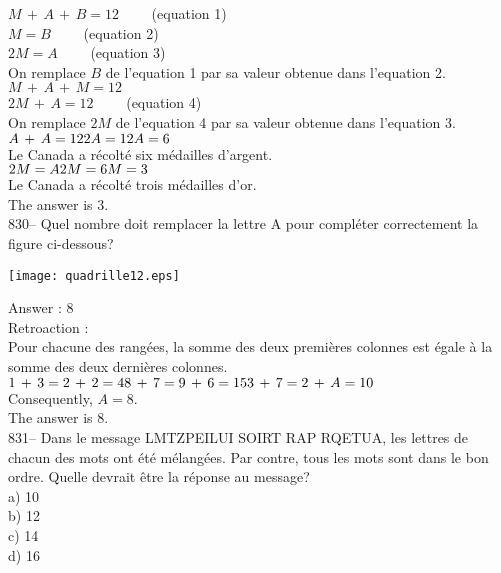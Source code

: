 ﻿\documentclass[letterpaper, 12pt]{article}
\begin{document}
$M\,+\,A\,+\,B=12 \qquad$ (equation 1)\\
$M=B \qquad$ (equation 2)\\
$2M=A \qquad$ (equation 3)\\

On remplace $B$ de l'equation 1 par sa valeur obtenue dans l'equation
2.\\
$M\,+\,A\,+\,M=12$\\
$2M\,+\,A=12 \qquad$ (equation 4)\\

On remplace $2M$ de l'equation 4 par sa valeur obtenue dans l'equation
3.\\
$A\,+\,A=12\\
2A = 12\\
A=6$\\
Le Canada a r\'ecolt\'e six m\'edailles d'argent.\\

$2M=A\\
2M=6\\
M=3$\\
Le Canada a r\'ecolt\'e trois m\'edailles d'or.\\


The answer is 3.\\

830-- Quel nombre doit remplacer la lettre A pour compl\'eter correctement
la figure ci-dessous?\\
    \begin{center}
    \texttt{[image: quadrille12.eps]}
    \end{center}


Answer : 8\\

Retroaction : \\
Pour chacune des rang\'ees, la somme des deux premi\`eres colonnes est
\'egale \`a la somme des deux derni\`eres colonnes.\\
$1\,+\,3=2\,+\,2=4\\
8\,+\,7=9\,+\,6=15\\
3\,+\,7=2\,+\,A=10$\\
Consequently, $A=8$.\\
The answer is 8.\\

831-- Dans le message \og LMTZPEILUI SOIRT RAP RQETUA\fg , les
lettres de chacun des mots ont \'et\'e m\'elang\'ees.  Par contre,
tous les mots sont dans le
bon ordre.  Quelle devrait \^etre la r\'eponse au message?\\
a) 10\\
b) 12\\
c) 14\\
d)  16\\
\end{document}

